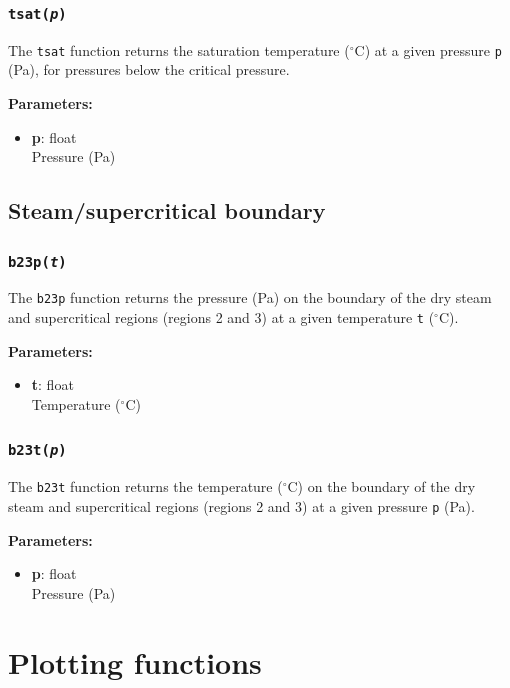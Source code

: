 \subsubsection{\texttt{tsat(\emph{p})}}

The \texttt{tsat} function returns the saturation temperature ($^{\circ}$C) at a given pressure \texttt{p} (Pa), for pressures below the critical pressure.

\textbf{Parameters:}
\begin{itemize}
\item \textbf{p}: float\\
  Pressure (Pa)
\end{itemize}

\subsection{Steam/supercritical boundary}
\label{region23_boundary}

\subsubsection{\texttt{b23p(\emph{t})}}

The \texttt{b23p} function returns the pressure (Pa) on the boundary of the dry steam and supercritical regions (regions 2 and 3) at a given temperature \texttt{t} ($^{\circ}$C).

\textbf{Parameters:}
\begin{itemize}
\item \textbf{t}: float\\
  Temperature ($^{\circ}$C)
\end{itemize}

\subsubsection{\texttt{b23t(\emph{p})}}

The \texttt{b23t} function returns the temperature ($^{\circ}$C) on the boundary of the dry steam and supercritical regions (regions 2 and 3) at a given pressure \texttt{p} (Pa).

\textbf{Parameters:}
\begin{itemize}
\item \textbf{p}: float\\
  Pressure (Pa)
\end{itemize}

\section{Plotting functions}

